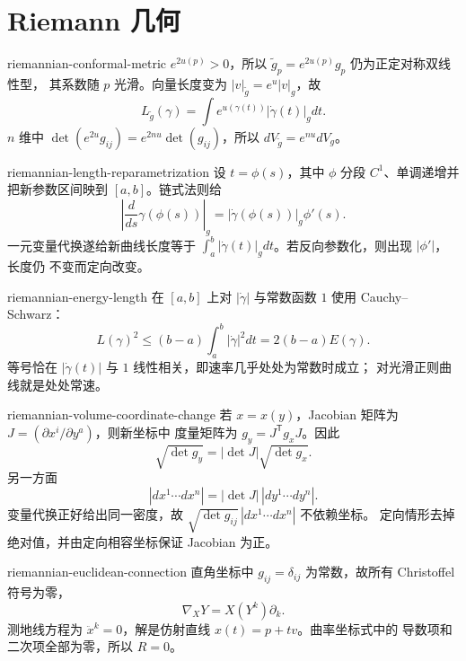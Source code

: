 \chapter{Riemann 几何}

\begin{solution}{riemannian-conformal-metric}
$e^{2u(p)}>0$，所以 $\widetilde g_p=e^{2u(p)}g_p$ 仍为正定对称双线性型，
其系数随 $p$ 光滑。向量长度变为
$|v|_{\widetilde g}=e^u|v|_g$，故
\[
 L_{\widetilde g}(\gamma)=\int e^{u(\gamma(t))}|\dot\gamma(t)|_gdt.
\]
$n$ 维中 $\det(e^{2u}g_{ij})=e^{2nu}\det(g_{ij})$，所以
$dV_{\widetilde g}=e^{nu}dV_g$。
\end{solution}

\begin{solution}{riemannian-length-reparametrization}
设 $t=\phi(s)$，其中 $\phi$ 分段 $C^1$、单调递增并把新参数区间映到
$[a,b]$。链式法则给
\[
 \left|\frac d{ds}\gamma(\phi(s))\right|_g
 =|\dot\gamma(\phi(s))|_g\phi'(s).
\]
一元变量代换遂给新曲线长度等于
$\int_a^b|\dot\gamma(t)|_gdt$。若反向参数化，则出现 $|\phi'|$，长度仍
不变而定向改变。
\end{solution}

\begin{solution}{riemannian-energy-length}
在 $[a,b]$ 上对 $|\dot\gamma|$ 与常数函数 $1$ 使用
Cauchy--Schwarz：
\[
 L(\gamma)^2\le(b-a)\int_a^b|\dot\gamma|^2dt
 =2(b-a)E(\gamma).
\]
等号恰在 $|\dot\gamma(t)|$ 与 $1$ 线性相关，即速率几乎处处为常数时成立；
对光滑正则曲线就是处处常速。
\end{solution}

\begin{solution}{riemannian-volume-coordinate-change}
若 $x=x(y)$，Jacobian 矩阵为 $J=(\partial x^i/\partial y^a)$，则新坐标中
度量矩阵为 $g_y=J^{\mathsf T}g_xJ$。因此
\[
 \sqrt{\det g_y}=|\det J|\sqrt{\det g_x}.
\]
另一方面
\[
 |dx^1\cdots dx^n|
 =|\det J|\,|dy^1\cdots dy^n|.
\]
变量代换正好给出同一密度，故
$\sqrt{\det g_{ij}}\,|dx^1\cdots dx^n|$ 不依赖坐标。
定向情形去掉绝对值，并由定向相容坐标保证 Jacobian 为正。
\end{solution}

\begin{solution}{riemannian-euclidean-connection}
直角坐标中 $g_{ij}=\delta_{ij}$ 为常数，故所有 Christoffel 符号为零，
\[
 \nabla_XY=X(Y^k)\partial_k.
\]
测地线方程为 $\ddot x^k=0$，解是仿射直线 $x(t)=p+tv$。曲率坐标式中的
导数项和二次项全部为零，所以 $R=0$。
\end{solution}

